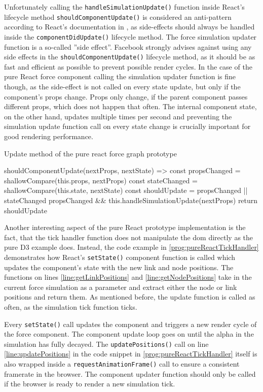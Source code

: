 Unfortunately calling the \texttt{handleSimulationUpdate()} function inside React's lifecycle method \texttt{shouldComponentUpdate()} is considered an anti-pattern according to React's documentation in \cite[/docs/react-component.html]{React}, as side-effects should always be handled inside the \texttt{componentDidUpdate()} lifecycle method. The force simulation updater function is a so-called ''side effect''. Facebook strongly advises against using any side effects in the \texttt{shouldComponentUpdate()} lifecycle method, as it should be as fast and efficient as possible to prevent possible render cycles. In the case of the pure React force component calling the simulation updater function is fine though, as the side-effect is not called on every state update, but only if the component's props change. Props only change, if the parent component passes different props, which does not happen that often. The internal component state, on the other hand, updates multiple times per second and preventing the simulation update function call on every state change is crucially important for good rendering performance.

\begin{program}
\caption{Update method of the pure react force graph prototype}
\label{prog:pureReactSimulationUpdate}
\begin{JsCode}
shouldComponentUpdate(nextProps, nextState) => {
  const propsChanged = shallowCompare(this.props, nextProps)
  const stateChanged = shallowCompare(this.state, nextState)
  const shouldUpdate = propsChanged || stateChanged
  propsChanged && this.handleSimulationUpdate(nextProps)
  return shouldUpdate
}
\end{JsCode}
\end{program}

Another interesting aspect of the pure React prototype implementation is the fact, that the tick handler function does not manipulate the dom directly as the pure D3 example does. Instead, the code example in \ref{prog:pureReactTickHandler} demonstrates how React's \texttt{setState()} component function is called which updates the component's state with the new link and node positions. The functions on lines \ref{line:getLinkPositions} and \ref{line:getNodePositions} take in the current force simulation as a parameter and extract either the node or link positions and return them. As mentioned before, the update function is called as often, as the simulation tick function ticks. 

Every \texttt{setState()} call updates the component and triggers a new render cycle of the force component. The component update loop goes on until the alpha in the simulation has fully decayed. The \texttt{updatePositions()} call on line \ref{line:updatePositions} in the code snippet in \ref{prog:pureReactTickHandler} itself is also wrapped inside a \texttt{requestAnimationFrame()} call to ensure a consistent framerate in the browser. The component updater function should only be called if the browser is ready to render a new simulation tick.

